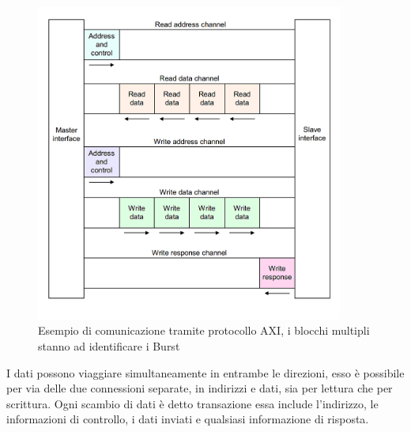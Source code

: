 \begin{figure}
    \centering
    \includegraphics[width=0.9\textwidth]{images/AXI2.jpg}
    \caption{Esempio di comunicazione tramite protocollo AXI, i blocchi multipli stanno ad identificare i Burst}
    \label{fig:my_label}
\end{figure}
I dati possono viaggiare simultaneamente in entrambe le direzioni, esso è possibile per via delle due connessioni separate, in indirizzi e dati, sia per lettura che per scrittura. Ogni scambio di dati è detto transazione essa include l'indirizzo, le informazioni di controllo, i dati inviati e qualsiasi informazione di risposta.
